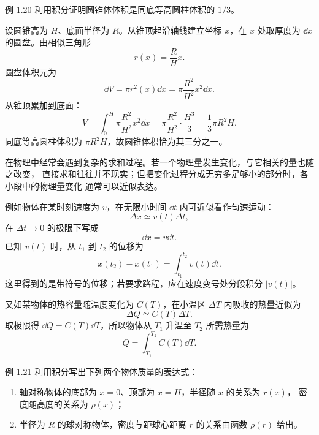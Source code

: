 \begin{origexamplebox}{例 1.20}
利用积分证明圆锥体体积是同底等高圆柱体积的 $1/3$。
\end{origexamplebox}

\begin{xesolution}
设圆锥高为 $H$、底面半径为 $R$。从锥顶起沿轴线建立坐标 $x$，在 $x$ 处取厚度为
$\dd x$ 的圆盘。由相似三角形
\[
 r(x)=\frac{R}{H}x.
\]
圆盘体积元为
\[
 \dd V=\pi r^2(x)\dd x
 =\pi\frac{R^2}{H^2}x^2\dd x.
\]
从锥顶累加到底面：
\[
 V=\int_0^H\pi\frac{R^2}{H^2}x^2\dd x
 =\pi\frac{R^2}{H^2}\cdot\frac{H^3}{3}
 =\boxed{\frac13\pi R^2H}.
\]
同底等高圆柱体积为 $\pi R^2H$，故圆锥体积恰为其三分之一。
\end{xesolution}

在物理中经常会遇到复杂的求和过程。若一个物理量发生变化，与它相关的量也随之改变，
直接求和往往并不现实；但把变化过程分成无穷多足够小的部分时，各小段中的物理量变化
通常可以近似表达。

例如物体在某时刻速度为 $v$，在无限小时间 $\dd t$ 内可近似看作匀速运动：
\begin{equation}
 \Delta x\simeq v(t)\Delta t,
\end{equation}
在 $\Delta t\to0$ 的极限下写成
\begin{equation}
 \dd x=v\dd t.
\end{equation}
已知 $v(t)$ 时，从 $t_1$ 到 $t_2$ 的位移为
\begin{equation}
 x(t_2)-x(t_1)=\int_{t_1}^{t_2}v(t)\dd t.
\end{equation}
这里得到的是带符号的位移；若要求路程，应在速度变号处分段积分 $|v(t)|$。

又如某物体的热容量随温度变化为 $C(T)$，在小温区 $\Delta T$ 内吸收的热量近似为
\begin{equation}
 \Delta Q\simeq C(T)\Delta T.
\end{equation}
取极限得 $\dd Q=C(T)\dd T$，所以物体从 $T_1$ 升温至 $T_2$ 所需热量为
\begin{equation}
 Q=\int_{T_1}^{T_2}C(T)\dd T.
\end{equation}

\begin{origexamplebox}{例 1.21}
利用积分写出下列两个物体质量的表达式：
\begin{enumerate}[label=(\alph*),leftmargin=2.2em]
 \item 轴对称物体的底部为 $x=0$、顶部为 $x=H$，半径随 $x$ 的关系为 $r(x)$，
 密度随高度的关系为 $\rho(x)$；
 \item 半径为 $R$ 的球对称物体，密度与距球心距离 $r$ 的关系由函数 $\rho(r)$ 给出。
\end{enumerate}
\end{origexamplebox}

